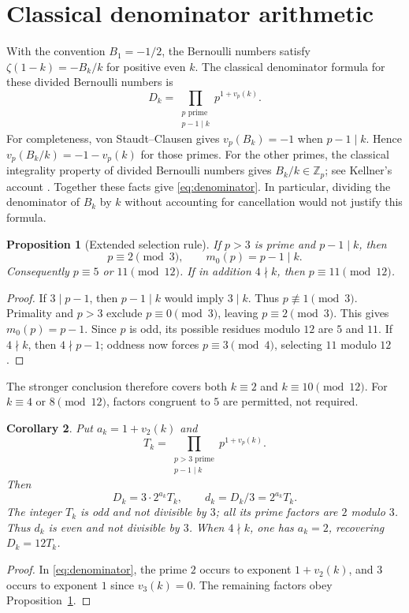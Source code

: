 \documentclass[11pt,a4paper]{article}
\newtheorem{proposition}{Proposition}
\newtheorem{corollary}[proposition]{Corollary}
\begin{document}
\section{Classical denominator arithmetic}
With the convention $B_1=-1/2$, the Bernoulli numbers satisfy
$\zeta(1-k)=-B_k/k$ for positive even $k$. The classical denominator
formula for these divided Bernoulli numbers is
\begin{equation}\label{eq:denominator}
 D_k=\prod_{\substack{p\text{ prime}\\p-1\mid k}}p^{1+v_p(k)}.
\end{equation}
For completeness, von Staudt--Clausen gives $v_p(B_k)=-1$ when
$p-1\mid k$. Hence $v_p(B_k/k)=-1-v_p(k)$ for those primes.
For the other primes, the classical integrality property of divided
Bernoulli numbers gives $B_k/k\in\mathbb Z_p$; see Kellner's account
\cite{kellner}. Together these facts give \eqref{eq:denominator}.
In particular, dividing the denominator of $B_k$ by $k$ without accounting
for cancellation would not justify this formula.

\begin{proposition}[Extended selection rule]\label{prop:selection}
If $p>3$ is prime and $p-1\mid k$, then
\[
 \boxed{p\equiv2\pmod3,\qquad m_0(p)=p-1\mid k.}
\]
Consequently $p\equiv5$ or $11\pmod{12}$. If in addition $4\nmid k$,
then $p\equiv11\pmod{12}$.
\end{proposition}
\begin{proof}
If $3\mid p-1$, then $p-1\mid k$ would imply $3\mid k$.
Thus $p\not\equiv1\pmod3$. Primality and $p>3$ exclude
$p\equiv0\pmod3$, leaving $p\equiv2\pmod3$.
This gives $m_0(p)=p-1$. Since $p$ is odd, its possible residues
modulo $12$ are $5$ and $11$. If $4\nmid k$, then $4\nmid p-1$;
oddness now forces $p\equiv3\pmod4$, selecting $11$ modulo $12$.
\end{proof}
The stronger conclusion therefore covers both $k\equiv2$ and
$k\equiv10\pmod{12}$. For $k\equiv4$ or $8\pmod{12}$, factors
congruent to $5$ are permitted, not required.

\begin{corollary}\label{cor:shape}
Put $a_k=1+v_2(k)$ and
\[
 T_k=\prod_{\substack{p>3\text{ prime}\\p-1\mid k}}p^{1+v_p(k)}.
\]
Then
\[
 D_k=3\cdot2^{a_k}T_k,\qquad d_k=D_k/3=2^{a_k}T_k.
\]
The integer $T_k$ is odd and not divisible by $3$; all its prime factors
are $2$ modulo $3$. Thus $d_k$ is even and not divisible by $3$.
When $4\nmid k$, one has $a_k=2$, recovering $D_k=12T_k$.
\end{corollary}
\begin{proof}
In \eqref{eq:denominator}, the prime $2$ occurs to exponent
$1+v_2(k)$, and $3$ occurs to exponent $1$ since $v_3(k)=0$.
The remaining factors obey Proposition~\ref{prop:selection}.
\end{proof}
\end{document}
